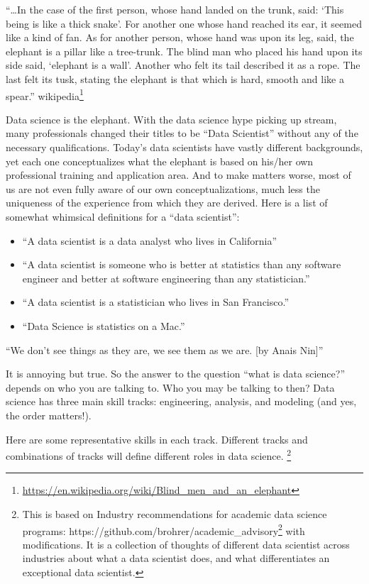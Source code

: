 \documentclass[12pt,]{krantz}
\providecommand{\tightlist}{%
  \setlength{\itemsep}{0pt}\setlength{\parskip}{0pt}}
\renewenvironment{quote}{\begin{VF}}{\end{VF}}
\renewcommand{\href}[2]{#2\footnote{\url{#1}}}
\begin{document}
\begin{quote}
``\ldots{}In the case of the first person, whose hand landed on the trunk, said: `This being is like a thick snake'. For another one whose hand reached its ear, it seemed like a kind of fan. As for another person, whose hand was upon its leg, said, the elephant is a pillar like a tree-trunk. The blind man who placed his hand upon its side said, `elephant is a wall'. Another who felt its tail described it as a rope. The last felt its tusk, stating the elephant is that which is hard, smooth and like a spear.'' \href{https://en.wikipedia.org/wiki/Blind_men_and_an_elephant}{wikipedia}
\end{quote}

Data science is the elephant. With the data science hype picking up stream, many professionals changed their titles to be ``Data Scientist'' without any of the necessary qualifications. Today's data scientists have vastly different backgrounds, yet each one conceptualizes what the elephant is based on his/her own professional training and application area. And to make matters worse, most of us are not even fully aware of our own conceptualizations, much less the uniqueness of the experience from which they are derived. Here is a list of somewhat whimsical definitions for a ``data scientist'':

\begin{itemize}
\tightlist
\item
  ``A data scientist is a data analyst who lives in California''
\item
  ``A data scientist is someone who is better at statistics than any software engineer and better at software engineering than any statistician.''
\item
  ``A data scientist is a statistician who lives in San Francisco.''
\item
  ``Data Science is statistics on a Mac.''
\end{itemize}

\begin{quote}
``We don't see things as they are, we see them as we are. {[}by Anais Nin{]}''
\end{quote}

It is annoying but true. So the answer to the question ``what is data science?'' depends on who you are talking to. Who you may be talking to then? Data science has three main skill tracks: engineering, analysis, and modeling (and yes, the order matters!).

Here are some representative skills in each track. Different tracks and combinations of tracks will define different roles in data science. \footnote{This is based on \href{https://github.com/brohrer/academic_advisory}{Industry recommendations for academic data science programs: https://github.com/brohrer/academic\_advisory} with modifications. It is a collection of thoughts of different data scientist across industries about what a data scientist does, and what differentiates an exceptional data scientist.}
\end{document}
